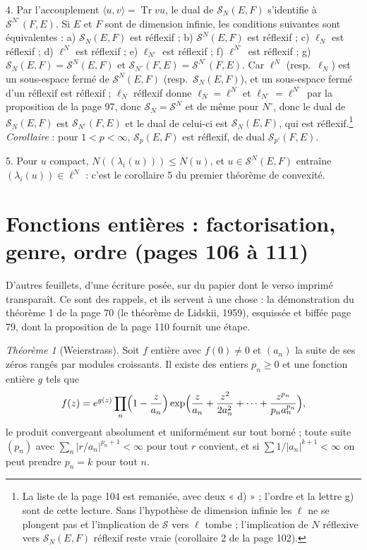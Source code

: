 \documentclass[11pt,a4paper]{article}
\begin{document}
4. Par l'accouplement $\langle u, v\rangle = \operatorname{Tr} vu$, le dual de
$\mathcal{S}_N(E,F)$ s'identifie à $\mathcal{S}^{N^{\circ}}(F,E)$. Si $E$ et
$F$ sont de dimension infinie, les conditions suivantes sont équivalentes :
a) $\mathcal{S}_N(E,F)$ est réflexif ; b) $\mathcal{S}^N(E,F)$ est réflexif ;
c) $\ell_N$ est réflexif ; d) $\ell^N$ est réflexif ; e) $\ell_{N^{\circ}}$
est réflexif ; f) $\ell^{N^{\circ}}$ est réflexif ; g) $\mathcal{S}_N(E,F) =
\mathcal{S}^N(E,F)$ et $\mathcal{S}_{N^{\circ}}(F,E) = \mathcal{S}^{N^{\circ}}(F,E)$.
Car $\ell^N$ (resp.\ $\ell_N$) est un sous-espace fermé de
$\mathcal{S}^N(E,F)$ (resp.\ $\mathcal{S}_N(E,F)$), et un sous-espace fermé
d'un réflexif est réflexif ; $\ell_N$ réflexif donne $\ell_N = \ell^N$ et
$\ell_{N^{\circ}} = \ell^{N^{\circ}}$ par la proposition de la page 97, donc
$\mathcal{S}_N = \mathcal{S}^N$ et de même pour $N^{\circ}$, donc le dual de
$\mathcal{S}_N(E,F)$ est $\mathcal{S}_{N^{\circ}}(F,E)$ et le dual de celui-ci
est $\mathcal{S}_N(E,F)$, qui est réflexif.\footnote{La liste de la page 104
est remaniée, avec deux « d) » ; l'ordre et la lettre g) sont de cette
lecture. Sans l'hypothèse de dimension infinie les $\ell$ ne se plongent pas
et l'implication de $\mathcal{S}$ vers $\ell$ tombe ; l'implication de
$N$ réflexive vers $\mathcal{S}_N(E,F)$ réflexif reste vraie (corollaire 2 de
la page 102).} \emph{Corollaire} : pour $1 < p < \infty$, $\mathcal{S}_p(E,F)$
est réflexif, de dual $\mathcal{S}_{p'}(F,E)$.

5. Pour $u$ compact, $N((\lambda_i(u))) \leq N(u)$, et $u \in
\mathcal{S}^N(E,F)$ entraîne $(\lambda_i(u)) \in \ell^N$ : c'est le
corollaire 5 du premier théorème de convexité.

\section*{Fonctions entières : factorisation, genre, ordre (pages 106 à 111)}

D'autres feuillets, d'une écriture posée, sur du papier dont le verso
imprimé transparaît. Ce sont des rappels, et ils servent à une chose : la
démonstration du théorème 1 de la page 70 (le théorème de Lidskii, 1959),
esquissée et biffée page 79, dont la proposition de la page 110 fournit une
étape.

\emph{Théorème 1} (Weierstrass). Soit $f$ entière avec $f(0) \neq 0$ et
$(a_n)$ la suite de ses zéros rangés par modules croissants. Il existe des
entiers $p_n \geq 0$ et une fonction entière $g$ tels que
\[
  f(z) = e^{g(z)} \prod_n \Bigl(1 - \frac{z}{a_n}\Bigr)
  \exp\Bigl(\frac{z}{a_n} + \frac{z^2}{2a_n^2} + \cdots + \frac{z^{p_n}}{p_n a_n^{p_n}}\Bigr),
\]
le produit convergeant absolument et uniformément sur tout borné ; toute
suite $(p_n)$ avec $\sum_n |r/a_n|^{p_n + 1} < \infty$ pour tout $r$ convient,
et si $\sum 1/|a_n|^{k+1} < \infty$ on peut prendre $p_n = k$ pour tout $n$.
\end{document}
